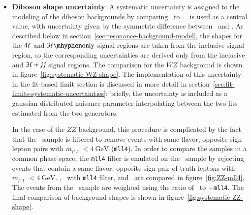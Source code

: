 \begin{itemize}
	\item \textbf{Diboson shape uncertainty}: A systematic uncertainty is assigned to the modeling of the diboson backgrounds by comparing \sherpa\ to \powheg. \sherpa\ is used as a central value, with uncertainty given by the symmetric difference between \sherpa\ and \powheg. As described below in section~\ref{sec:resonance-background-model}, the shapes for the $4\ell$ and $\threelo$ signal regions are taken from the inclusive signal region, so the corresponding uncertainties are derived only from the inclusive and $3\ell+jj$ signal regions. The comparison for the $WZ$ background is shown in figure~\ref{fig:systematic-WZ-shape}. The implementation of this uncertainty in the fit-based limit section is discussed in more detail in section~\ref{sec:fit-limits-systematic-uncertainties}; briefly, the uncertainty is included as a gaussian-distributed nuisance parameter interpolating between the two fits estimated from the two generators.

	In the case of the $ZZ$ background, this procedure is complicated by the fact that the \powheg\ sample is filtered to remove events with same-flavor, opposite-sign lepton pairs with $m_{l^+l^-}<4~\mbox{GeV}$ (\texttt{mll4}). In order to compare the samples in a common phase space, the \texttt{mll4} filter is emulated on the \sherpa\ sample by rejecting events that contain a same-flavor, opposite-sign pair of truth leptons with $m_{l^+l^-}<4~\mbox{GeV}$. \sherpa, \sherpa\ with \texttt{mll4} filter, and \powheg\ are compared in figure~\ref{fig:ZZ-mll4}. The events from the \powheg\ sample are weighted using the ratio of \sherpa\ to \sherpa+\texttt{mll4}. The final comparison of background shapes is shown in figure~\ref{fig:systematic-ZZ-shape}.


\end{itemize}
